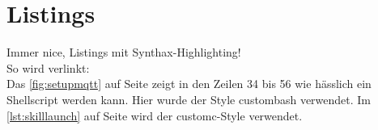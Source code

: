 \chapter{Listings}

Immer nice, Listings mit Synthax-Highlighting!\\



So wird verlinkt: \\

Das \autoref{fig:setupmqtt} auf Seite \pageref{fig:setupmqtt} zeigt in den Zeilen 34 bis 56 wie hässlich ein Shellscript werden kann. Hier wurde der Style custombash verwendet. Im \autoref{lst:skilllaunch} auf Seite \pageref{lst:skilllaunch} wird der customc-Style verwendet.



